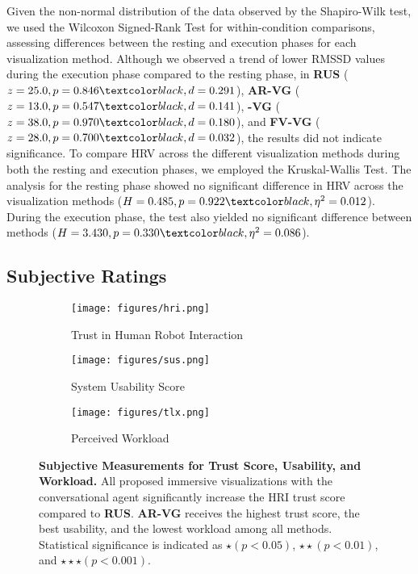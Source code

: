 Given the non-normal distribution of the data observed by the Shapiro-Wilk test, we used the Wilcoxon Signed-Rank Test for within-condition comparisons, assessing differences between the resting and execution phases for each visualization method. Although we observed a trend of lower RMSSD values during the execution phase compared to the resting phase, in \textbf{RUS} ($z = 25.0, p = 0.846\add{, d = 0.291}$), \textbf{AR-VG} ($z = 13.0, p = 0.547\add{, d = 0.141}$), \textbf{-VG} ($z = 38.0, p = 0.970\add{, d = 0.180}$), and \textbf{FV-VG} ($z = 28.0, p = 0.700\add{, d = 0.032}$), the results did not indicate significance.
To compare HRV across the different visualization methods during both the resting and execution phases, we employed the Kruskal-Wallis Test. The analysis for the resting phase showed no significant difference in HRV across the visualization methods ($H = 0.485, p = 0.922\add{, \eta^2 = 0.012}$). During the execution phase, the test also yielded no significant difference between methods ($H = 3.430, p = 0.330\add{, \eta^2 = 0.086}$).



\subsection{Subjective Ratings}

\begin{figure*}[t]
    \centering
    \begin{subfigure}[b]{0.325\textwidth}
        \centering
        \texttt{[image: figures/hri.png]}
        \caption{Trust in Human Robot Interaction}
        \label{fig:hri}
    \end{subfigure}
    \hfill %
    \begin{subfigure}[b]{0.325\textwidth}
        \centering
        \texttt{[image: figures/sus.png]}
        \caption{System Usability Score}
        \label{fig:sus}
    \end{subfigure}
    \hfill %
    \begin{subfigure}[b]{0.325\textwidth}
        \centering
        \texttt{[image: figures/tlx.png]}
        \caption{Perceived Workload}
        \label{fig:tlx}
    \end{subfigure}
    \caption{\textbf{Subjective Measurements for Trust Score, Usability, and Workload.} All proposed immersive visualizations with the conversational agent significantly increase the HRI trust score compared to \textbf{RUS}. \textbf{AR-VG} receives the highest trust score, the best usability, and the lowest workload among all methods. Statistical significance is indicated as $\star \left( p<0.05 \right)$, $\star \star \left( p<0.01 \right)$, and $\star \star \star \left( p<0.001 \right)$.}
    \label{fig:subjective}
\end{figure*}

